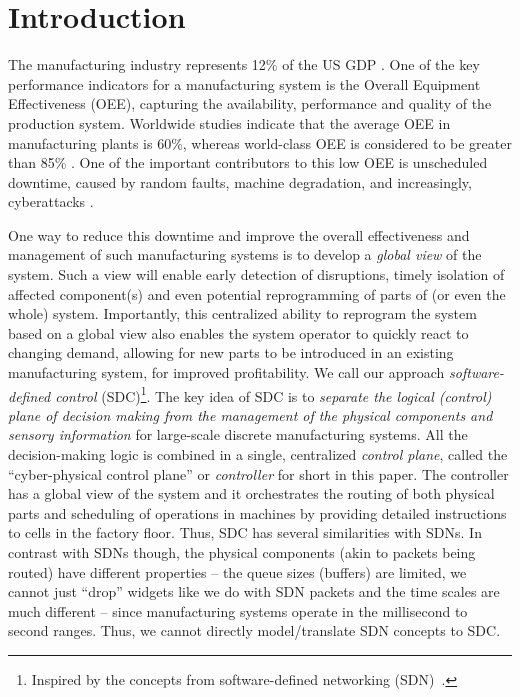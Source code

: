 \section{Introduction}
\label{sec:intro}

The manufacturing industry represents 12\% of the US GDP
\cite{mfg-innov-report}. One of the key performance indicators for a
manufacturing system is the Overall Equipment Effectiveness (OEE),  capturing
the availability, performance and quality of the production system.  Worldwide
studies indicate that the average OEE in manufacturing plants is 60\%, whereas
world-class OEE is considered to be greater than 85\% \cite{Ahmad2002171}.  One
of the important contributors to this low OEE is unscheduled downtime, caused
by random faults, machine degradation, and increasingly, cyberattacks
\cite{ics-cert,mfg-cyber-14,zetter15,hon2005performance,jonsson1999evaluation,ahmad2002establishing}.

One way to reduce this downtime and improve the overall effectiveness and
management of such manufacturing systems is to develop a {\em global view} of
the system. Such a view will enable \ca early detection of disruptions, \cb
timely isolation of affected component(s) and even \cc potential
reprogramming of parts of (or even the whole) system. Importantly, this
centralized ability to reprogram the system based on a global view also enables
the system operator to quickly react to changing demand, allowing for new parts
to be introduced in an existing manufacturing system, for improved
profitability. We call our approach {\em software-defined control}
(SDC)\footnote{Inspired by the concepts from software-defined networking
(SDN)~\cite{mckeown2008openflow}.}. The key idea of SDC is to {\em separate the logical (control) plane of
decision making from the management of the physical components and sensory
information} for large-scale discrete manufacturing systems. All the
decision-making logic is combined in a single, centralized {\em control plane},
called the ``cyber-physical control plane'' or {\em controller\/} for short in this paper.
The controller has a global view of
the system and it orchestrates  the routing of both physical parts and scheduling of operations in machines by providing detailed instructions to cells in the factory floor. 
Thus, SDC has several similarities with SDNs. In contrast with 
SDNs though, the physical components (akin to packets being routed) have 
different properties -- \ci the queue sizes (buffers) are limited, 
\cii we cannot just ``drop'' widgets like we do with SDN packets and
\ciii the time scales are much different -- since manufacturing systems
operate in the millisecond to second ranges. Thus, we cannot  
directly model/translate SDN concepts to SDC.

